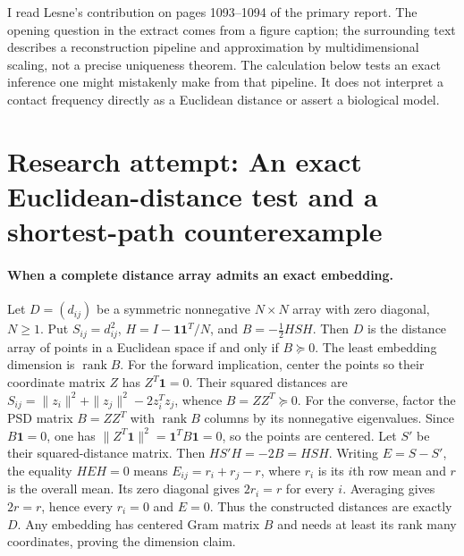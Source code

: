 \documentclass[11pt]{article}
\begin{document}
I read Lesne's contribution on pages 1093--1094 of the primary report.
The opening question in the extract comes from a figure caption; the surrounding
text describes a reconstruction pipeline and approximation by multidimensional
scaling, not a precise uniqueness theorem. The calculation below tests an exact
inference one might mistakenly make from that pipeline. It does not interpret
a contact frequency directly as a Euclidean distance or assert a biological model.

\section{Research attempt: An exact Euclidean-distance test and a shortest-path counterexample}

\paragraph{When a complete distance array admits an exact embedding.}
Let $D=(d_{ij})$ be a symmetric nonnegative $N\times N$ array with zero
diagonal, $N\geq1$. Put $S_{ij}=d_{ij}^2$,
$H=I-\mathbf1\mathbf1^T/N$, and $B=-\frac12HSH$.
Then $D$ is the distance array of points in a Euclidean space if and only if
$B\succeq0$. The least embedding dimension is $\operatorname{rank}B$.
For the forward implication, center the points so their coordinate matrix $Z$
has $Z^T\mathbf1=0$. Their squared distances are
$S_{ij}=\|z_i\|^2+\|z_j\|^2-2z_i^Tz_j$, whence $B=ZZ^T\succeq0$.
For the converse, factor the PSD matrix $B=ZZ^T$ with $\operatorname{rank}B$
columns by its nonnegative eigenvalues. Since $B\mathbf1=0$, one has
$\|Z^T\mathbf1\|^2=\mathbf1^TB\mathbf1=0$, so the points are centered.
Let $S'$ be their squared-distance matrix. Then $HS'H=-2B=HSH$.
Writing $E=S-S'$, the equality $HEH=0$ means
$E_{ij}=r_i+r_j-r$, where $r_i$ is its $i$th row mean and $r$ is the overall
mean. Its zero diagonal gives $2r_i=r$ for every $i$. Averaging gives
$2r=r$, hence every $r_i=0$ and $E=0$. Thus the constructed distances are
exactly $D$. Any embedding has centered Gram matrix $B$ and needs at least
its rank many coordinates, proving the dimension claim.
\end{document}
